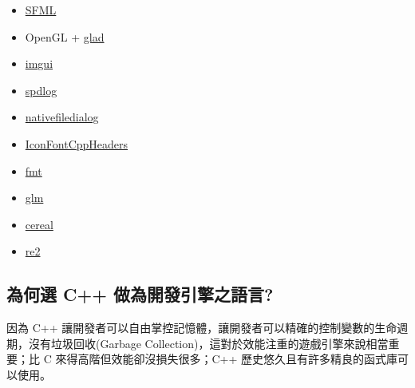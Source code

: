 \begin{itemize}
	\item{\href{https://www.sfml-dev.org/}{SFML}}

	\item{OpenGL + \href{https://github.com/Dav1dde/glad}{glad}}

	\item{\href{https://github.com/ocornut/imgui}{imgui}}

	\item{\href{https://github.com/gabime/spdlog}{spdlog}}

	\item{\href{https://github.com/mlabbe/nativefiledialog}{nativefiledialog}}

	\item{\href{https://github.com/juliettef/IconFontCppHeaders}{IconFontCppHeaders}}

	\item{\href{https://github.com/fmtlib/fmt}{fmt}}

	\item{\href{https://github.com/g-truc/glm}{glm}}

	\item{\href{https://github.com/USCiLab/cereal}{cereal}}

	\item{\href{https://github.com/google/re2}{re2}}
 \end{itemize}

\subsection{為何選 C++ 做為開發引擎之語言?}

因為 C++ 讓開發者可以自由掌控記憶體，讓開發者可以精確的控制變數的生命週期，沒有垃圾回收(Garbage Collection)，這對於效能注重的遊戲引擎來說相當重要；比 C 來得高階但效能卻沒損失很多；C++ 歷史悠久且有許多精良的函式庫可以使用。 \cite{WhyCppUsedInGameEngine}
